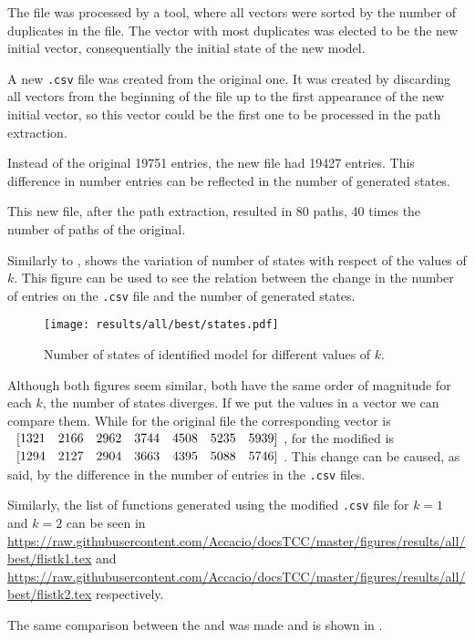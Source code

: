 The file was processed by a tool, where all vectors
were sorted by the number of duplicates in the file. The vector with most
duplicates was elected to be the new initial vector, consequentially the initial
state of the new model.

A new \verb|.csv| file was created from the original one. It was created by
discarding all vectors from the beginning of the file up to the
first appearance of the new initial vector, so this vector could be the first
one to be processed in the path extraction.

Instead of the original 19751 entries, the new
file 
had 19427 entries. This difference in number entries can be reflected in the number of
generated states.

This new file, after the path extraction, resulted in 80 paths, 40 times the
number of paths of the original.  

Similarly to , 
shows the variation of number of states with respect of the values of $k$. This
figure can be used to see the relation
between the change in the number of entries on the \verb|.csv| file and the
number of generated states.
\begin{figure}[H]
  \centering
  \texttt{[image: results/all/best/states.pdf]}
  \caption{Number of states of identified model for different values of $k$.}
    \label{fig:statesIdentBest}
\end{figure}
Although both figures seem similar, both have the same order of magnitude for
each $k$, the number of states diverges. If we put the values in a vector we can
compare them. While for the original file the corresponding vector is
$\colvec{1321& 2166& 2962& 3744& 4508& 5235& 5939}$, for the modified is 
$\colvec{1294& 2127& 2904& 3663& 4395& 5088& 5746}$.
This change can be caused, as said, by the difference in the number of entries
in the \verb|.csv| files.

Similarly, the list of \ffunction{} functions generated using the modified \verb|.csv| file
for $k=1$ and $k=2$
can be seen in  
\url{https://raw.githubusercontent.com/Accacio/docsTCC/master/figures/results/all/best/flistk1.tex}
and
\url{https://raw.githubusercontent.com/Accacio/docsTCC/master/figures/results/all/best/flistk2.tex}
respectively.

The same comparison between the \DAOCT{} and \NDAAO{} was made and is shown in .

